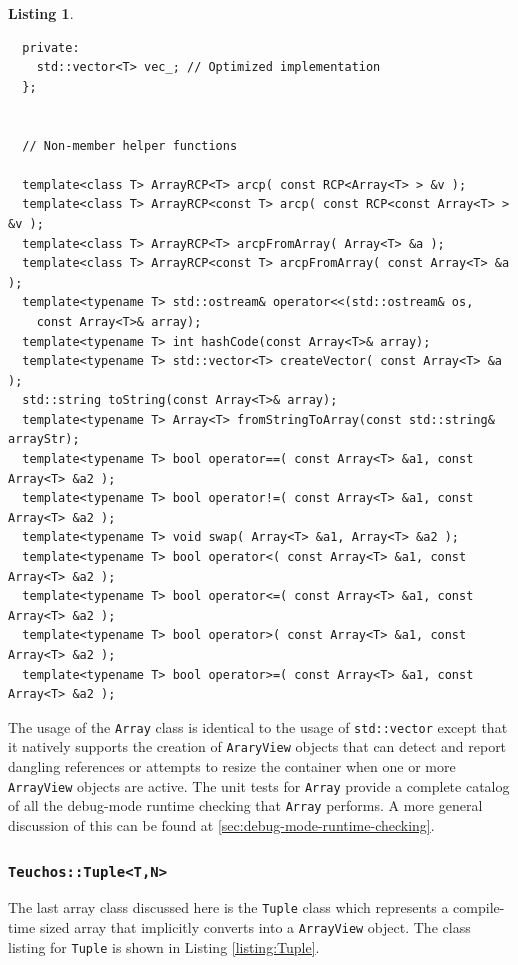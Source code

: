 \documentclass[pdf,ps2pdf,11pt]{SANDreport}
\newtheorem{listing}{Listing}
\begin{document}
\begin{listing}
{\begin{verbatim}
  private:
    std::vector<T> vec_; // Optimized implementation
  };
  
  
  // Non-member helper functions
  
  template<class T> ArrayRCP<T> arcp( const RCP<Array<T> > &v );
  template<class T> ArrayRCP<const T> arcp( const RCP<const Array<T> > &v );
  template<class T> ArrayRCP<T> arcpFromArray( Array<T> &a );
  template<class T> ArrayRCP<const T> arcpFromArray( const Array<T> &a );
  template<typename T> std::ostream& operator<<(std::ostream& os,
    const Array<T>& array);
  template<typename T> int hashCode(const Array<T>& array);
  template<typename T> std::vector<T> createVector( const Array<T> &a );
  std::string toString(const Array<T>& array);
  template<typename T> Array<T> fromStringToArray(const std::string& arrayStr);
  template<typename T> bool operator==( const Array<T> &a1, const Array<T> &a2 );
  template<typename T> bool operator!=( const Array<T> &a1, const Array<T> &a2 );
  template<typename T> void swap( Array<T> &a1, Array<T> &a2 );
  template<typename T> bool operator<( const Array<T> &a1, const Array<T> &a2 );
  template<typename T> bool operator<=( const Array<T> &a1, const Array<T> &a2 );
  template<typename T> bool operator>( const Array<T> &a1, const Array<T> &a2 );
  template<typename T> bool operator>=( const Array<T> &a1, const Array<T> &a2 );
\end{verbatim}}
\end{listing}

The usage of the {}\texttt{Array} class is identical to the usage of
{}\texttt{std::vector} except that it natively supports the creation
of {}\texttt{AraryView} objects that can detect and report dangling
references or attempts to resize the container when one or more
{}\texttt{ArrayView} objects are active.  The unit tests for
{}\texttt{Array} provide a complete catalog of all the debug-mode
runtime checking that {}\texttt{Array} performs.  A more general
discussion of this can be found at
{}\ref{sec:debug-mode-runtime-checking}.


%
{}\subsubsection{\texttt{Teuchos::Tuple<T,N>}}
%

The last array class discussed here is the {}\texttt{Tuple} class
which represents a compile-time sized array that implicitly converts
into a {}\texttt{ArrayView} object.  The class listing for
{}\texttt{Tuple} is shown in Listing {}\ref{listing:Tuple}.
\end{document}
